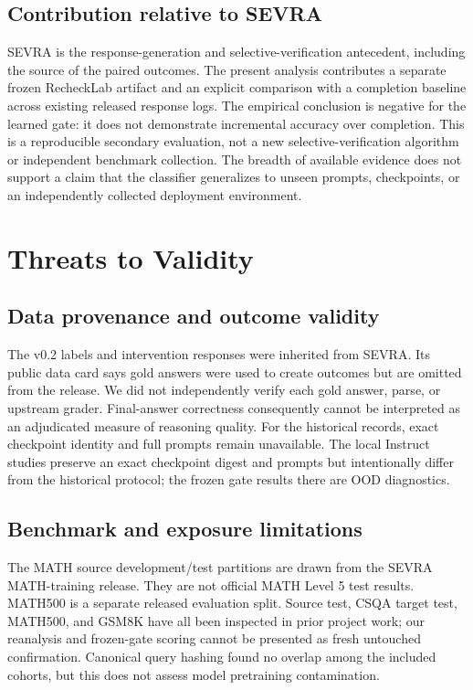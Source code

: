\documentclass[conference]{IEEEtran}
\begin{document}
\subsection{Contribution relative to SEVRA}
SEVRA is the response-generation and selective-verification antecedent, including the source of the paired outcomes. The present analysis contributes a separate frozen RecheckLab artifact and an explicit comparison with a completion baseline across existing released response logs. The empirical conclusion is negative for the learned gate: it does not demonstrate incremental accuracy over completion. This is a reproducible secondary evaluation, not a new selective-verification algorithm or independent benchmark collection. The breadth of available evidence does not support a claim that the classifier generalizes to unseen prompts, checkpoints, or an independently collected deployment environment.

\section{Threats to Validity}
\subsection{Data provenance and outcome validity}
The v0.2 labels and intervention responses were inherited from SEVRA. Its public data card says gold answers were used to create outcomes but are omitted from the release. We did not independently verify each gold answer, parse, or upstream grader. Final-answer correctness consequently cannot be interpreted as an adjudicated measure of reasoning quality. For the historical records, exact checkpoint identity and full prompts remain unavailable. The local Instruct studies preserve an exact checkpoint digest and prompts but intentionally differ from the historical protocol; the frozen gate results there are OOD diagnostics.

\subsection{Benchmark and exposure limitations}
The MATH source development/test partitions are drawn from the SEVRA MATH-training release. They are not official MATH Level 5 test results. MATH500 is a separate released evaluation split. Source test, CSQA target test, MATH500, and GSM8K have all been inspected in prior project work; our reanalysis and frozen-gate scoring cannot be presented as fresh untouched confirmation. Canonical query hashing found no overlap among the included cohorts, but this does not assess model pretraining contamination.
\end{document}

